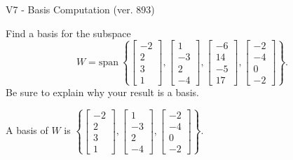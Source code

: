 \begin{exercise}
  \begin{exerciseTitle}V7 - Basis Computation (ver. 893)\end{exerciseTitle}
  \begin{exerciseStatement}
    Find a basis for the subspace 
\[W=\mathrm{span}\ \left\{\left[\begin{array}{r}
-2 \\
2 \\
3 \\
1
\end{array}\right] , \left[\begin{array}{r}
1 \\
-3 \\
2 \\
-4
\end{array}\right] , \left[\begin{array}{r}
-6 \\
14 \\
-5 \\
17
\end{array}\right] , \left[\begin{array}{r}
-2 \\
-4 \\
0 \\
-2
\end{array}\right]\right\}.\]
 Be sure to explain why your result is a basis.


  \end{exerciseStatement}
  \begin{exerciseAnswer}
   A basis of \(W\) is  \(\left\{\left[\begin{array}{r}
-2 \\
2 \\
3 \\
1
\end{array}\right] , \left[\begin{array}{r}
1 \\
-3 \\
2 \\
-4
\end{array}\right] , \left[\begin{array}{r}
-2 \\
-4 \\
0 \\
-2
\end{array}\right]\right\}\).
  


  \end{exerciseAnswer}
\end{exercise}